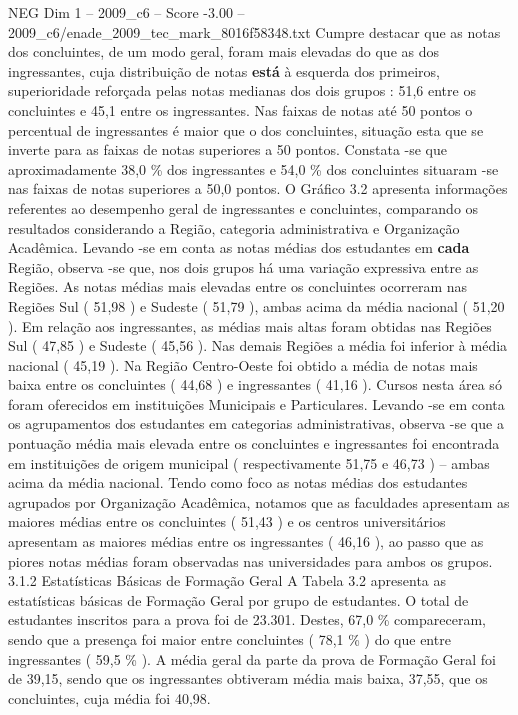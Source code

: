 \begin{textsample}{NEG Dim 1 – 2009\_c6 – Score -3.00 – 2009\_c6/enade\_2009\_tec\_mark\_8016f58348.txt}
Cumpre destacar que as notas dos concluintes, de um modo geral, foram mais elevadas do que as dos ingressantes, cuja distribuição de notas \textbf{está} à esquerda dos primeiros, superioridade reforçada pelas notas medianas dos dois grupos : 51,6 entre os concluintes e 45,1 entre os ingressantes.
Nas faixas de notas até 50 pontos o percentual de ingressantes é maior que o dos concluintes, situação esta que se inverte para as faixas de notas superiores a 50 pontos.
Constata -se que aproximadamente 38,0 \% dos ingressantes e 54,0 \% dos concluintes situaram -se nas faixas de notas superiores a 50,0 pontos.
O Gráfico 3.2 apresenta informações referentes ao desempenho geral de ingressantes e concluintes, comparando os resultados considerando a Região, categoria administrativa e Organização Acadêmica.
Levando -se em conta as notas médias dos estudantes em \textbf{cada} Região, observa -se que, nos dois grupos há uma variação expressiva entre as Regiões.
As notas médias mais elevadas entre os concluintes ocorreram nas Regiões Sul ( 51,98 ) e Sudeste ( 51,79 ), ambas acima da média nacional ( 51,20 ).
Em relação aos ingressantes, as médias mais altas foram obtidas nas Regiões Sul ( 47,85 ) e Sudeste ( 45,56 ).
Nas demais Regiões a média foi inferior à média nacional ( 45,19 ).
Na Região Centro-Oeste foi obtido a média de notas mais baixa entre os concluintes ( 44,68 ) e ingressantes ( 41,16 ).
Cursos nesta área só foram oferecidos em instituições Municipais e Particulares.
Levando -se em conta os agrupamentos dos estudantes em categorias administrativas, observa -se que a pontuação média mais elevada entre os concluintes e ingressantes foi encontrada em instituições de origem municipal ( respectivamente 51,75 e 46,73 ) – ambas acima da média nacional.
Tendo como foco as notas médias dos estudantes agrupados por Organização Acadêmica, notamos que as faculdades apresentam as maiores médias entre os concluintes ( 51,43 ) e os centros universitários apresentam as maiores médias entre os ingressantes ( 46,16 ), ao passo que as piores notas médias foram observadas nas universidades para ambos os grupos. 3.1.2 Estatísticas Básicas de Formação Geral A Tabela 3.2 apresenta as estatísticas básicas de Formação Geral por grupo de estudantes.
O total de estudantes inscritos para a prova foi de 23.301.
Destes, 67,0 \% compareceram, sendo que a presença foi maior entre concluintes ( 78,1 \% ) do que entre ingressantes ( 59,5 \% ).
A média geral da parte da prova de Formação Geral foi de 39,15, sendo que os ingressantes obtiveram média mais baixa, 37,55, que os concluintes, cuja média foi 40,98.

\end{textsample}
